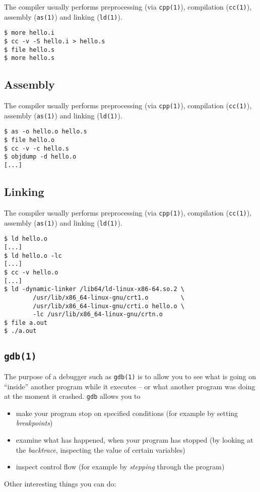 \documentclass[xga]{xdvislides}
\begin{document}
The compiler usually performs preprocessing (via {\tt cpp(1)}), compilation
({\tt cc(1)}), assembly ({\tt as(1)}) and linking ({\tt ld(1)}).

\begin{verbatim}
$ more hello.i
$ cc -v -S hello.i > hello.s
$ file hello.s
$ more hello.s
\end{verbatim}

\subsection{Assembly}

The compiler usually performs preprocessing (via {\tt cpp(1)}), compilation
({\tt cc(1)}), assembly ({\tt as(1)}) and linking ({\tt ld(1)}).

\begin{verbatim}
$ as -o hello.o hello.s
$ file hello.o
$ cc -v -c hello.s
$ objdump -d hello.o
[...]
\end{verbatim}

\subsection{Linking}

The compiler usually performs preprocessing (via {\tt cpp(1)}), compilation
({\tt cc(1)}), assembly ({\tt as(1)}) and linking ({\tt ld(1)}).

\begin{verbatim}
$ ld hello.o
[...]
$ ld hello.o -lc
[...]
$ cc -v hello.o
[...]
$ ld -dynamic-linker /lib64/ld-linux-x86-64.so.2 \
        /usr/lib/x86_64-linux-gnu/crt1.o         \
        /usr/lib/x86_64-linux-gnu/crti.o hello.o \
        -lc /usr/lib/x86_64-linux-gnu/crtn.o
$ file a.out
$ ./a.out
\end{verbatim}

\subsection{{\tt gdb(1)}}

The purpose of a debugger such as {\tt gdb(1)} is to allow you to see what is
going on ``inside'' another program while it executes -- or what another
program was doing at the moment it crashed. {\tt gdb} allows you to

\begin{itemize}
	\item make your program stop on specified conditions (for example by
		setting {\em breakpoints})
	\item examine what has happened, when your program has stopped (by looking
		at the {\em backtrace}, inspecting the value of certain variables)
	\item inspect control flow (for example by {\em stepping} through the
		program)
\end{itemize}
\vspace{.25in}
Other interesting things you can do:
\end{document}
